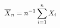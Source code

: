 \documentclass[preview]{standalone}
\begin{document}
\begin{align*}
\special{dvisvgm:raw <g id='unique000'>}\overline X_n=n^{-1}\sum_{i=1}^nX_i\special{dvisvgm:raw </g>}
\end{align*}
\end{document}

